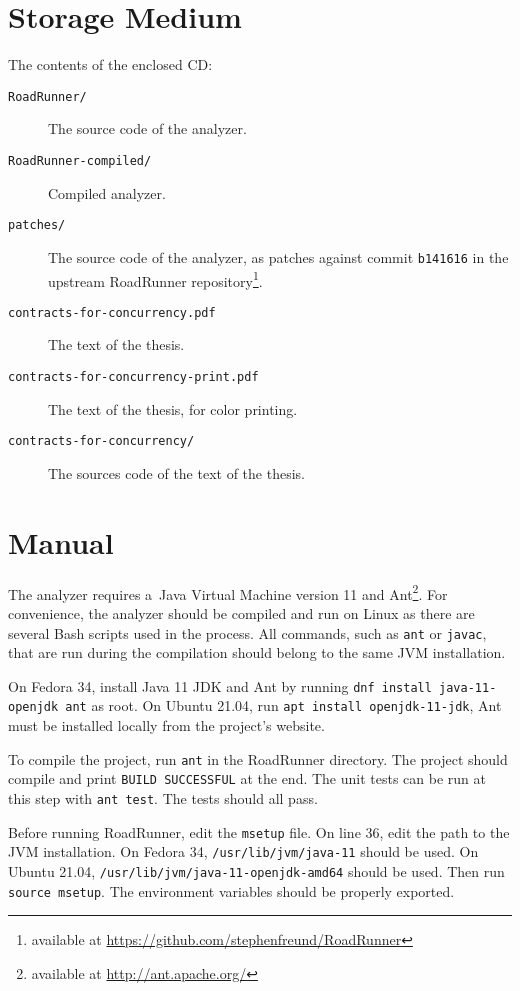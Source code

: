 \chapter{Storage Medium}
\label{storage}

The contents of the enclosed CD:
\begin{description}
    \item [\texttt{RoadRunner/}] The source code of the analyzer.
    \item [\texttt{RoadRunner-compiled/}] Compiled analyzer.
    \item [\texttt{patches/}] The source code of the analyzer, as patches
        against commit \texttt{b141616} in the upstream RoadRunner
        repository\footnote{available at
        \url{https://github.com/stephenfreund/RoadRunner}}.
    \item [\texttt{contracts-for-concurrency.pdf}] The text of the
        thesis.
    \item [\texttt{contracts-for-concurrency-print.pdf}] The text of
        the thesis, for color printing.
    \item [\texttt{contracts-for-concurrency/}] The sources code of the text of
        the thesis.
\end{description}

\chapter{Manual}
\label{manual}

The analyzer requires a~Java Virtual Machine version 11 and
Ant\footnote{available at \url{http://ant.apache.org/}}. For
convenience, the analyzer should be compiled and run on Linux as there are
several Bash scripts used in the process. All commands, such as \texttt{ant} or
\texttt{javac}, that are run during the compilation should belong to the same
JVM installation.

On Fedora 34, install Java 11 JDK and Ant by running
\texttt{dnf install java-11-openjdk ant} as root. On Ubuntu 21.04, run
\texttt{apt install openjdk-11-jdk}, Ant must be installed locally from the
project's website.

To compile the project, run \texttt{ant} in the RoadRunner directory. The
project should compile and print \texttt{BUILD SUCCESSFUL} at the end. The unit
tests can be run at this step with \texttt{ant test}. The tests should all pass.

Before running RoadRunner, edit the \texttt{msetup} file. On line 36, edit the
path to the JVM installation. On Fedora 34, \texttt{/usr/lib/jvm/java-11} should
be used. On Ubuntu 21.04, \texttt{/usr/lib/jvm/java-11-openjdk-amd64} should be
used. Then run \texttt{source msetup}. The environment variables should be
properly exported.


